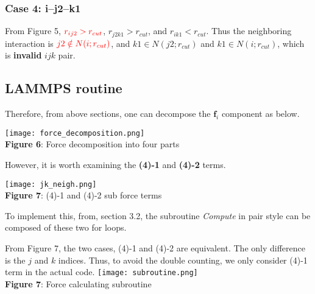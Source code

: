 \documentclass[11pt, oneside]{article}   	%
\begin{document}
\subsubsection{Case 4: i--j2--k1}
From Figure 5, $\color{red} r_{ij2} > r_{cut}$, $r_{j2k1} > r_{cut}$, and $r_{ik1} < r_{cut}$. Thus the neighboring interaction is $\color{red} j2 \notin N(i;r_{cut})$, and $ k1 \in N(j2;r_{cut})$ and $k1 \in N(i;r_{cut})$, which is {\color{red} \textbf{invalid}} $ijk$ pair.

\subsection{LAMMPS routine}
Therefore, from above sections, one can decompose the $\mathbf{f}_i$ component as below.
\begin{center}
\texttt{[image: force\_decomposition.png]} \\
\textbf{Figure 6}: Force decomposition into four parts
\end{center}
However, it is worth examining the \textbf{(4)-1} and \textbf{(4)-2} terms. 
\begin{center}
\texttt{[image: jk\_neigh.png]} \\
\textbf{Figure 7}: (4)-1 and (4)-2 sub force terms
\end{center}
To implement this, from, section 3.2, the subroutine \textit{Compute} in pair style can be composed of these two for loops.
 \begin{center}
 From Figure 7, the two cases, (4)-1 and (4)-2 are equivalent. The only difference is the $j$ and $k$ indices. Thus, to avoid the double counting, we only consider (4)-1 term in the actual code. 
\texttt{[image: subroutine.png]} \\
\textbf{Figure 7}: Force calculating subroutine
\end{center}
\end{document}
